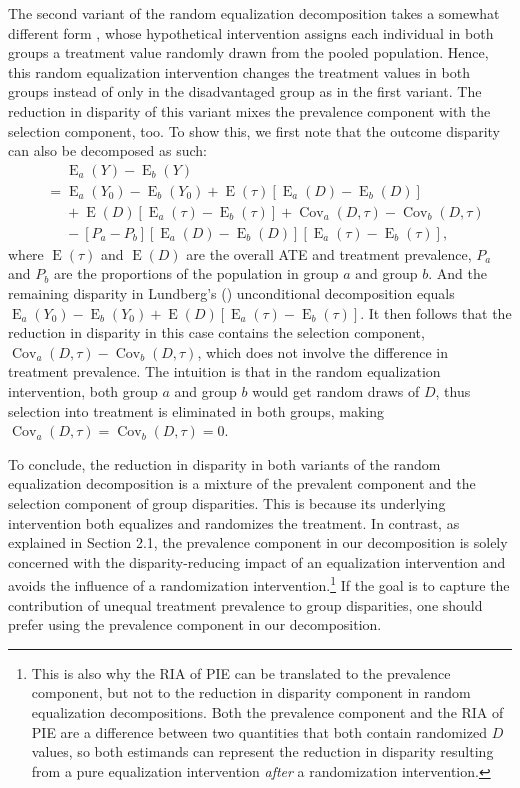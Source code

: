 \documentclass[12pt,a4paper]{article}
\newcommand{\Cov}{\operatorname{Cov}}
\newcommand{\E}{\operatorname{E}}
\begin{document}
The second variant of the random equalization decomposition takes a somewhat different form \citep{lundberg_gap-closing_2022}, whose hypothetical intervention assigns each individual in both groups a treatment value randomly drawn from the pooled population. Hence, this random equalization intervention changes the treatment values in both groups instead of only in the disadvantaged group as in the first variant. The reduction in disparity of this variant  mixes the prevalence component with the selection component, too. To show this, we first note that the outcome disparity can also be decomposed as such: 
\begin{align*}
&\phantom{{}={}} \E_a(Y)-\E_b(Y) \\
&= \E_a(Y_{0})-\E_b(Y_{0}) + \E(\tau)[\E_a(D)-\E_b(D)] \\
&\phantom{{}={}} + \E(D)[ \E_a(\tau) - \E_b(\tau)] + \Cov_a(D, \tau) - \Cov_b(D, \tau) \\
&\phantom{{}={}} - [P_a-P_b][\E_a(D) - \E_b(D)][\E_a(\tau)-\E_b(\tau)], 
\end{align*} 
where $\E(\tau)$ and $\E(D)$ are the overall ATE and treatment prevalence, $P_a$ and $P_b$ are the proportions of the population in group $a$ and group $b$.
And the remaining disparity in Lundberg's (\citeyear{lundberg_gap-closing_2022}) unconditional decomposition equals 
$\E_a(Y_{0})-\E_b(Y_{0}) + \E(D)[ \E_a(\tau) - \E_b(\tau)] \nonumber$. It then follows that the reduction in disparity in this case contains the selection component, $\Cov_a(D, \tau) -  \Cov_b(D, \tau)$, which does not involve the difference in treatment prevalence. The intuition is that in the random equalization intervention, both group $a$ and group $b$ would get random draws of $D$, thus  selection into treatment is eliminated in both groups, making $\Cov_a(D,\tau)=\Cov_b(D,\tau)=0$.

To conclude, the reduction in disparity in both variants of the random equalization decomposition is a mixture of the prevalent component and the selection component of group disparities. This is because its underlying intervention both equalizes and randomizes the treatment. In contrast, as explained in Section 2.1,  the prevalence component in our decomposition is solely concerned with the disparity-reducing impact of an equalization intervention and avoids the influence of a randomization intervention.\footnote{This is also why the RIA of PIE can be translated to the prevalence component, but not to the reduction in disparity component in random equalization decompositions. Both the prevalence component and the RIA of PIE are a difference between two quantities that both contain randomized $D$ values, so both estimands can represent the reduction in disparity resulting from a pure equalization intervention \emph{after} a randomization intervention.} If the goal is to capture the contribution of unequal treatment prevalence to group disparities, one should prefer using the prevalence component in our decomposition.
 
\end{document}
